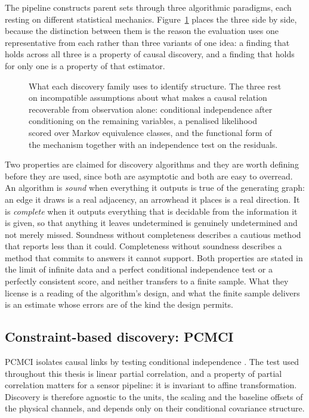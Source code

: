 The pipeline constructs parent sets through three algorithmic paradigms, each resting on different statistical mechanics. Figure~\ref{fig:paradigms} places the three side by side, because the distinction between them is the reason the evaluation uses one representative from each rather than three variants of one idea: a finding that holds across all three is a property of causal discovery, and a finding that holds for only one is a property of that estimator.

\begin{figure}[htbp]
  \centering
  \resizebox{\textwidth}{!}{}
  \caption[What each discovery family uses to identify structure]{What each discovery family uses to identify structure. The three rest on incompatible assumptions about what makes a causal relation recoverable from observation alone: conditional independence after conditioning on the remaining variables, a penalised likelihood scored over Markov equivalence classes, and the functional form of the mechanism together with an independence test on the residuals.}
  \label{fig:paradigms}
\end{figure}

Two properties are claimed for discovery algorithms and they are worth defining before they are used, since both are asymptotic and both are easy to overread. An algorithm is \emph{sound} when everything it outputs is true of the generating graph: an edge it draws is a real adjacency, an arrowhead it places is a real direction. It is \emph{complete} when it outputs everything that is decidable from the information it is given, so that anything it leaves undetermined is genuinely undetermined and not merely missed. Soundness without completeness describes a cautious method that reports less than it could. Completeness without soundness describes a method that commits to answers it cannot support. Both properties are stated in the limit of infinite data and a perfect conditional independence test or a perfectly consistent score, and neither transfers to a finite sample. What they license is a reading of the algorithm's design, and what the finite sample delivers is an estimate whose errors are of the kind the design permits.

\subsection{Constraint-based discovery: PCMCI}
\label{sec:bg-pcmci}

PCMCI isolates causal links by testing conditional independence \cite{runge2019pcmci}. The test used throughout this thesis is linear partial correlation, and a property of partial correlation matters for a sensor pipeline: it is invariant to affine transformation. Discovery is therefore agnostic to the units, the scaling and the baseline offsets of the physical channels, and depends only on their conditional covariance structure.

